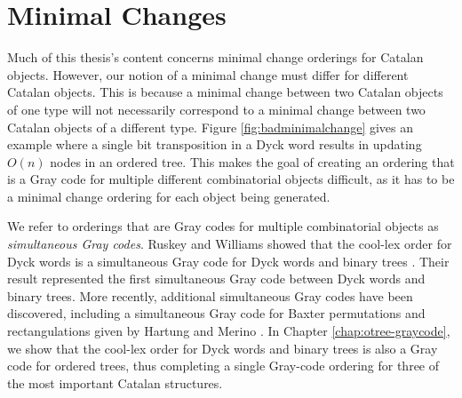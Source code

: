 \section{Minimal Changes}
Much of this thesis's content concerns minimal change orderings for Catalan objects.  However, our notion of a minimal change must differ for different Catalan objects.  This is because a minimal change between two Catalan objects of one type will not necessarily correspond to a minimal change between two Catalan objects of a different type.  Figure \ref{fig:badminimalchange} gives an example where a single bit transposition in a Dyck word results in updating $O(n)$ nodes in an ordered tree.  This makes the goal of creating an ordering that is a Gray code for multiple different combinatorial objects difficult, as it has to be a minimal change ordering for each object being generated.  

We refer to orderings that are Gray codes for multiple combinatorial objects as \emph{simultaneous Gray codes}.  Ruskey and Williams showed that the cool-lex order for Dyck words is a simultaneous Gray code for Dyck words and binary trees \cite{ruskey2008generating}.  Their result represented the first simultaneous Gray code between Dyck words and binary trees. More recently, additional simultaneous Gray codes have been discovered, including a simultaneous Gray code for Baxter permutations and rectangulations given by Hartung and Merino \cite{hartung2020combinatorial} \cite{merino2021efficient}.  In Chapter \ref{chap:otree-graycode}, we show that the cool-lex order for Dyck words and binary trees is also a Gray code for ordered trees, thus completing a single Gray-code ordering for three of the most important Catalan structures.


